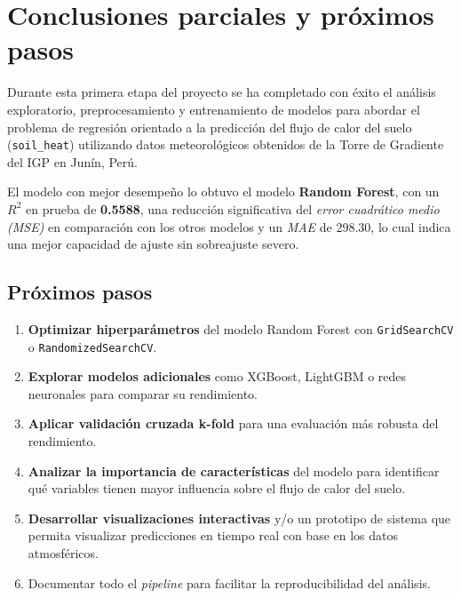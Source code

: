 \section{Conclusiones parciales y próximos pasos}

Durante esta primera etapa del proyecto se ha completado con éxito el análisis
exploratorio, preprocesamiento y entrenamiento de modelos para abordar el
problema de regresión orientado a la predicción del flujo de calor del suelo
(\texttt{soil\_heat}) utilizando datos meteorológicos obtenidos de la Torre de
Gradiente del IGP en Junín, Perú.

El modelo con mejor desempeño lo obtuvo el modelo \textbf{Random Forest}, con un
$R^2$ en prueba de \textbf{0.5588}, una reducción significativa del
\textit{error cuadrático medio (MSE)} en comparación con los otros modelos y un
\textit{MAE} de 298.30, lo cual indica una mejor capacidad de ajuste sin
sobreajuste severo.

\subsection*{Próximos pasos}
\begin{enumerate}
    \item \textbf{Optimizar hiperparámetros} del modelo Random Forest con
        \texttt{GridSearchCV} o \texttt{RandomizedSearchCV}.
    \item \textbf{Explorar modelos adicionales} como XGBoost, LightGBM o redes
        neuronales para comparar su rendimiento.
    \item \textbf{Aplicar validación cruzada k-fold} para una evaluación más
        robusta del rendimiento.
    \item \textbf{Analizar la importancia de características} del modelo para
        identificar qué variables tienen mayor influencia sobre el flujo de
        calor del suelo.
    \item \textbf{Desarrollar visualizaciones interactivas} y/o un prototipo de
        sistema que permita visualizar predicciones en tiempo real con base en
        los datos atmosféricos.
    \item Documentar todo el \textit{pipeline} para facilitar la
        reproducibilidad del análisis.
\end{enumerate}

